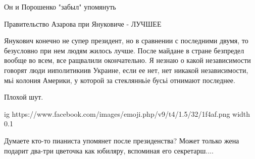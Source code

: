 \begin{itemize}
 
Он и Порошенко "забыл" упомянуть\Laughey[1.0][white]

 
Правительство Азарова при Януковиче - ЛУЧШЕЕ

 

Янукович конечно не супер президент, но в сравнении с последними двумя, то
безусловно при нем людям жилось лучше. После майдане в стране безпредел вообще
во всем, все ращвалили окончательно. Я незнаю о какой независимости говорят люди
ииполитикиив Украине, если ее нет, нет никакой независимости, мьі колония
Америки, у которой за стеклянньіе бусьі отнимают последнее.


 
Плохой шут.

 

\ifcmt
  ig https://www.facebook.com/images/emoji.php/v9/t4/1.5/32/1f4af.png
  width 0.1
\fi


 

Думаете кто-то пианиста упомянет после президенства? Может только жена подарит
два-три цветочка как юбиляру, вспоминая его секретарш....



\end{itemize}
